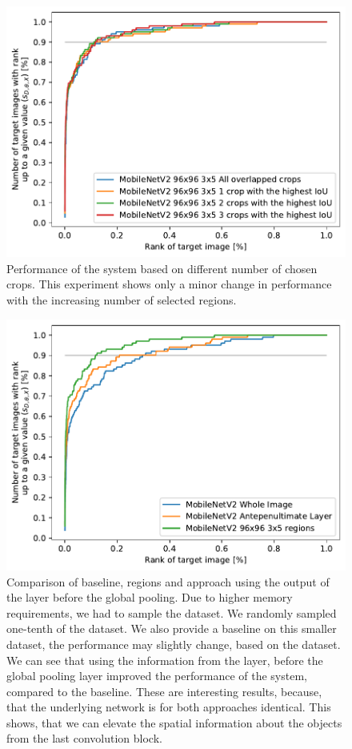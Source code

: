 \begin{figure}
\centering
\includegraphics[width=0.8\linewidth]{graphs/5c4a781f8e6f3eac93db2083bde3963c06582a92a8141411bf29e41251a98e75.pdf}
\caption{Performance of the system based on different number of chosen crops. This experiment shows only a minor change in performance with the increasing number of selected regions.}
\label{fig:crop_limitation}
\end{figure}

\begin{figure}
    \centering
    \includegraphics[width=0.8\linewidth]{graphs/adaf8d435bb40406f9ce40654ec396e04453ab76cf0776d2a87d385055d5424f.pdf}
    \caption{Comparison of baseline, regions and approach using the output of the layer before the global pooling. Due to higher memory requirements, we had to sample the dataset. We randomly sampled one-tenth of the dataset. We also provide a baseline on this smaller dataset, the performance may slightly change, based on the dataset. We can see that using the information from the layer, before the global pooling layer improved the performance of the system, compared to the baseline. These are interesting results, because, that the underlying network is for both approaches identical. This shows, that we can elevate the spatial information about the objects from the last convolution block.}
    \label{fig:antepenultimate}
\end{figure}

